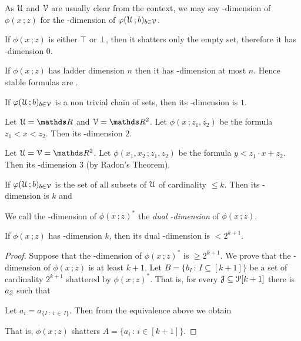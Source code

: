 \documentclass[scombinatorics.tex]{subfiles}
\begin{document}
As $\EuScript U$ and $\EuScript V$ are usually clear from the context, we may say \vc-dimension of $\phi(x\,;z)$ for the \vc-dimension of $\varphi(\EuScript U\,;b)_{b\in\EuScript V}$.

\begin{example}
  If $\phi(x\,;z)$ is either $\top$ or $\bot$, then it shatters only the empty set, therefore it has \vc-dimension $0$.\QED
\end{example}

\begin{example}
  If $\phi(x\,;z)$ has ladder dimension $n$ then it has \vc-dimension at most $n$. Hence stable formulas are \nip.\QED
\end{example}
 
\begin{example}
  If $\varphi(\EuScript U\,;b)_{b\in\EuScript V}$ is a non trivial chain of sets, then its \vc-dimension is $1$.\QED
\end{example}
 
\begin{example} 
  Let $\U=\RR$ and $\V=\RR^2$.
  Let $\phi(x\,;z_1,z_2)$ be the formula $z_1<x<z_2$.
  Then its \vc-dimension $2$.\QED
\end{example}
 
\begin{example} 
  Let $\U=\V=\RR^2$.
  Let $\phi(x_1,x_2\,;z_1,z_2)$ be the formula $y<z_1\cdot x + z_2$.
  Then its  \vc-dimension $3$ (by Radon's Theorem).\QED
\end{example}
 
\begin{example}\label{ex_vcdim_opt}
  If $\varphi(\EuScript U\,;b)_{b\in\EuScript V}$ is the set of all subsets of $\EuScript U$ of cardinality $\le k$.
  Then its \vc-dimension is $k$ and
  
  \QED
\end{example}

We call the \vc-dimension of $\phi(x\,;z)^*$ the \emph{dual \vc-dimension\/} of  $\phi(x\,;z)$.

\begin{proposition}
  If $\phi(x\,;z)$ has \vc-dimension $k$, then its dual \vc-dimension is $<2^{k+1}$.
\end{proposition}
  
\begin{proof}
  Suppose that the \vc-dimension of $\phi(x\,;z)^*$ is $\ge 2^{k+1}$.
  We prove that the \vc-dimension of $\phi(x\,;z)$ is at least $k+1$.
  Let $B=\big\{b_I\,:\,I\subseteq [k+1]\big\}$ be a set of cardinality $2^{k+1}$ shattered by $\phi(x\,;z)^*$. 
  That is, for every $\EuScript J\subseteq \EuScript P[k+1]$ there is $a_\EuScript J$ such that
  
  
  Let $a_i=a_{\{I\; :\ i\,\in\, I\}}$. Then from the equivalence above we obtain
  
  
  That is, $\phi(x\,;z)$ shatters $A=\big\{a_i\,:\, i\in [k+1]\big\}$.
\end{proof}
\end{document}
